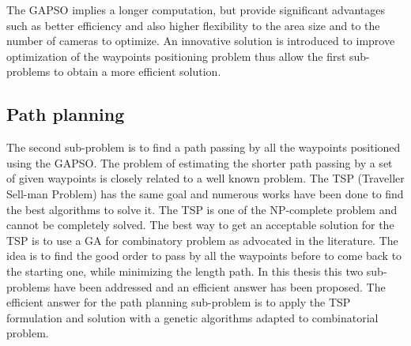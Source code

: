 The GAPSO implies a longer computation, but provide significant advantages such as better efficiency and also higher flexibility to the area size and to the number of  cameras to optimize.
An innovative solution is introduced to improve optimization of the waypoints positioning problem thus allow the first sub-problems to obtain a more efficient solution.

\subsection{Path planning}
The second sub-problem is to find a path passing by all the waypoints positioned using the GAPSO. The problem of estimating the shorter path passing by a set of given waypoints is closely related to a well known problem. The TSP (Traveller Sell-man Problem) has the same goal and numerous works have been done to find the best algorithms to solve it. The TSP is one of the NP-complete problem and cannot be completely solved. The best way to get an acceptable solution for the TSP is to use a GA for combinatory problem as advocated in the literature. 
The idea is to find the good order to pass by all the waypoints before to come back to the starting one, while  minimizing the length path. 
In this thesis this two sub-problems have been addressed and an efficient answer has been proposed. The efficient answer for the path planning sub-problem is to apply the TSP formulation and solution with a genetic algorithms adapted to combinatorial problem.

